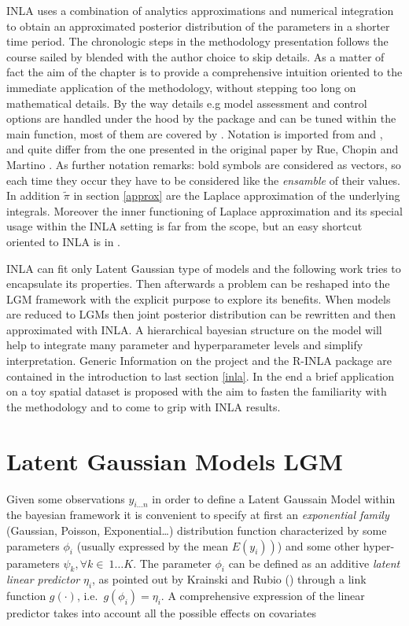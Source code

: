 \documentclass[
  12pt,
  a4paper,
  oneside]{book}
\begin{document}
INLA uses a combination of analytics approximations and numerical integration to obtain an approximated posterior distribution of the parameters in a shorter time period.
The chronologic steps in the methodology presentation follows the course sailed by \citet{Moraga2019} blended with the author choice to skip details. As a matter of fact the aim of the chapter is to provide a comprehensive intuition oriented to the immediate application of the methodology, without stepping too long on mathematical details. By the way details e.g model assessment and control options are handled under the hood by the package and can be tuned within the main function, most of them are covered by \citet{Bayesian_INLA_Rubio}. Notation is imported from \citet{Blangiardo-Cameletti} and \citet{Bayesian_INLA_Rubio}, and quite differ from the one presented in the original paper by Rue, Chopin and Martino \citeyearpar{Rue2009}. As further notation remarks: bold symbols are considered as vectors, so each time they occur they have to be considered like the \emph{ensamble} of their values. In addition \(\tilde\pi\) in section \ref{approx} are the Laplace approximation of the underlying integrals. Moreover the inner functioning of Laplace approximation and its special usage within the INLA setting is far from the scope, but an easy shortcut oriented to INLA is in \citet{Blangiardo-Cameletti}.

INLA can fit only Latent Gaussian type of models and the following work tries to encapsulate its properties. Then afterwards a problem can be reshaped into the LGM framework with the explicit purpose to explore its benefits. When models are reduced to LGMs then joint posterior distribution can be rewritten and then approximated with INLA. A hierarchical bayesian structure on the model will help to integrate many parameter and hyperparameter levels and simplify interpretation.
Generic Information on the project and the R-INLA package are contained in the introduction to last section \ref{inla}. In the end a brief application on a toy spatial dataset is proposed with the aim to fasten the familiarity with the methodology and to come to grip with INLA results.

\hypertarget{LGM}{%
\section{Latent Gaussian Models LGM}\label{LGM}}

Given some observations \(y_{i \ldots n}\) in order to define a Latent Gaussain Model within the bayesian framework it is convenient to specify at first an \emph{exponential family} (Gaussian, Poisson, Exponential\ldots) distribution function characterized by some parameters \(\phi_{i}\) (usually expressed by the mean \(\left.E\left(y_{i}\right)\right)\)) and some other hyper-parameters \(\psi_{k} ,\forall k \in \ 1\ldots K\). The parameter \(\phi_{i}\) can be defined as an additive \emph{latent linear predictor} \(\eta_{i}\), as pointed out by Krainski and Rubio (\citeyearpar{Krainski-Rubio}) through a link function \(g(\cdot)\), i.e.~\(g\left(\phi_{i}\right)=\eta_{i}\). A comprehensive expression of the linear predictor takes into account all the possible effects on covariates
\end{document}
